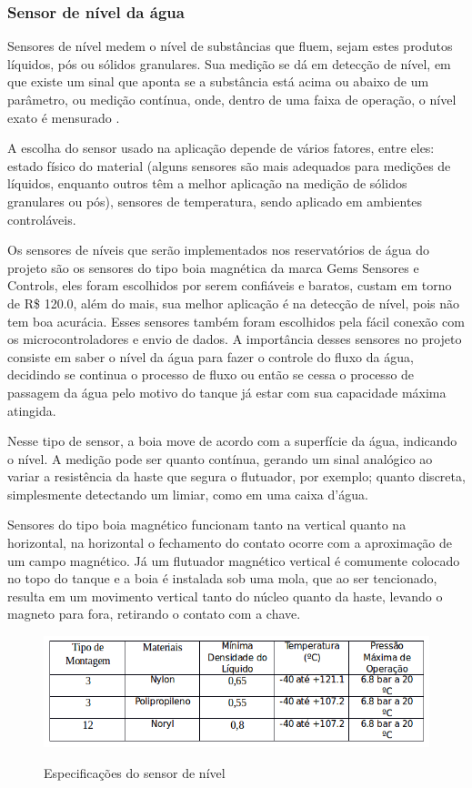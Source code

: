 \subsubsection{Sensor de nível da água}

  Sensores de nível medem o nível de substâncias que fluem, sejam estes produtos líquidos, pós ou sólidos granulares. Sua medição se dá em detecção de nível, em que existe um sinal que aponta se a substância está acima ou abaixo de um parâmetro, ou medição contínua, onde, dentro de uma faixa de operação, o nível exato é mensurado \cite{quintanilha13}.
  
  A escolha do sensor usado na aplicação depende de vários fatores, entre eles: estado físico do material (alguns sensores são mais adequados para medições de líquidos, enquanto outros têm a melhor aplicação na medição de sólidos granulares ou pós), sensores de temperatura, sendo aplicado em ambientes controláveis. 
  
  Os sensores de níveis que serão implementados nos reservatórios de água do projeto são os sensores do tipo boia magnética da marca Gems Sensores e Controls, eles foram escolhidos por serem confiáveis e baratos, custam em torno de R\$ 120.0, além do mais, sua melhor aplicação é na detecção de nível, pois não tem boa acurácia. Esses sensores também foram escolhidos pela fácil conexão com os microcontroladores e envio de dados. A importância desses sensores no projeto consiste em saber o nível da água para fazer o controle do fluxo da água, decidindo se continua o processo de fluxo ou então se cessa o processo de passagem da água pelo motivo do tanque já estar com sua capacidade máxima atingida. 

  Nesse tipo de sensor, a boia move de acordo com a superfície da água, indicando o nível. A medição pode ser quanto contínua, gerando um sinal analógico ao variar a resistência da haste que segura o flutuador, por exemplo; quanto discreta, simplesmente detectando um limiar, como em uma caixa d’água.
  
   
  Sensores do tipo boia magnético funcionam tanto na vertical quanto na horizontal, na horizontal o fechamento do contato ocorre com a aproximação de um campo magnético. Já um flutuador magnético vertical é comumente colocado no topo do tanque e a boia é instalada sob uma mola, que ao ser tencionado, resulta em um movimento vertical tanto do núcleo quanto da haste, levando o magneto para fora, retirando o contato com a chave. 
  
  \begin{figure}[!h]
    \centering
    \includegraphics[scale = 0.6]{editaveis/figuras/sensor_nivel_spec}
    \label{sensor_nivel_spec}
    \caption{Especificações do sensor de nível}
   \end{figure}
   \FloatBarrier
   
   \vfill